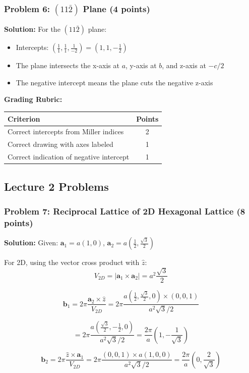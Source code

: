 \documentclass[12pt,a4paper]{article}
\begin{document}
\subsubsection*{Problem 6: $(11\bar{2})$ Plane (4 points)}
\textbf{Solution:}
For the $(11\bar{2})$ plane:
\begin{itemize}
    \item Intercepts: $(\frac{1}{1}, \frac{1}{1}, \frac{1}{-2}) = (1, 1, -\frac{1}{2})$
    \item The plane intersects the x-axis at $a$, y-axis at $b$, and z-axis at $-c/2$
    \item The negative intercept means the plane cuts the negative z-axis
\end{itemize}

\textbf{Grading Rubric:}
\begin{table}[h]
\centering
\begin{tabular}{|p{10cm}|c|}
\hline
\textbf{Criterion} & \textbf{Points} \\
\hline
Correct intercepts from Miller indices & 2 \\
Correct drawing with axes labeled & 1 \\
Correct indication of negative intercept & 1 \\
\hline
\end{tabular}
\end{table}

\subsection*{Lecture 2 Problems}

\subsubsection*{Problem 7: Reciprocal Lattice of 2D Hexagonal Lattice (8 points)}
\textbf{Solution:}
Given: $\mathbf{a}_1 = a(1,0)$, $\mathbf{a}_2 = a(\frac{1}{2}, \frac{\sqrt{3}}{2})$

For 2D, using the vector cross product with $\hat{z}$:
\[V_{2D} = |\mathbf{a}_1 \times \mathbf{a}_2| = a^2 \frac{\sqrt{3}}{2}\]

\[\mathbf{b}_1 = 2\pi \frac{\mathbf{a}_2 \times \hat{z}}{V_{2D}} = 2\pi \frac{a(\frac{1}{2}, \frac{\sqrt{3}}{2}, 0) \times (0,0,1)}{a^2\sqrt{3}/2}\]

\[= 2\pi \frac{a(\frac{\sqrt{3}}{2}, -\frac{1}{2}, 0)}{a^2\sqrt{3}/2} = \frac{2\pi}{a}(1, -\frac{1}{\sqrt{3}})\]

\[\mathbf{b}_2 = 2\pi \frac{\hat{z} \times \mathbf{a}_1}{V_{2D}} = 2\pi \frac{(0,0,1) \times a(1,0,0)}{a^2\sqrt{3}/2} = \frac{2\pi}{a}(0, \frac{2}{\sqrt{3}})\]
\end{document}
